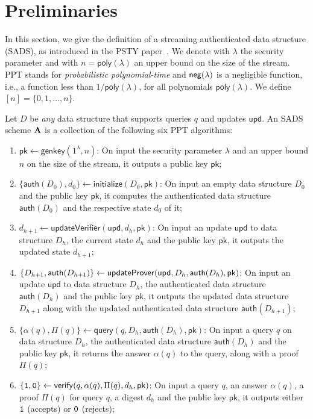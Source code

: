 \section{Preliminaries}\label{sads}
In this section, we give the definition of a streaming authenticated data structure (SADS), as introduced in the PSTY paper~\cite{DBLP:conf/eurocrypt/PapamanthouSTY13}.
We denote with $\lambda$ the security parameter and with $n=\mathsf{poly}(\lambda)$ an upper bound on the size of the stream. PPT stands for \emph{probabilistic polynomial-time} and $\mathsf{neg}(\lambda)$ is a negligible function, i.e., a function less than $1/\mathsf{poly}(\lambda)$, for all polynomials $\mathsf{poly}(\lambda)$. We define $[n]=\{0,1,\ldots,n\}$. 
\begin{defn}\label{define_sauth}
  Let $D$ be \emph{any} data structure that supports queries $q$ and
  updates $\mathsf{upd}$. An SADS scheme ${\bf A}$ is a collection of the following six PPT algorithms:
\begin{enumerate}
\item $\mathsf{pk}\leftarrow\mathsf{genkey}(1^\lambda,n)$: On
  input the security parameter $\lambda$ and an upper bound $n$ on the size of the stream, it outputs a public key $\mathsf{pk}$;

\item
  $\{\mathsf{auth}(D_0),d_0\}\leftarrow\mathsf{initialize}(D_0,\mathsf{pk})$:
  On input an empty data structure $D_0$ and the public key $\mathsf{pk}$, it computes the authenticated data structure $\mathsf{auth}(D_0)$ and the respective state $d_0$ of it;

\item
  $d_{h+1}\leftarrow\mathsf{updateVerifier}(\mathsf{upd},d_h,\mathsf{pk})$:
  On input an update $\mathsf{upd}$ to data structure $D_h$, the current state $d_h$ and the public key $\mathsf{pk}$, it outputs the updated state $d_{h+1}$;

\item
  $\{D_{h+1},\mathsf{auth}(D_{h+1})\}\leftarrow\mathsf{updateProver}(\mathsf{upd},D_h,\\ \mathsf{auth}(D_h),\mathsf{pk})$:
  On input an update $\mathsf{upd}$ to data structure $D_h$, the authenticated data
  structure $\mathsf{auth}(D_h)$ and the public key $\mathsf{pk}$, it
  outputs the updated data structure $D_{h+1}$ along with the updated
  authenticated data structure $\mathsf{auth}(D_{h+1})$;

\item
  $\{\alpha(q),\Pi(q)\}\leftarrow\mathsf{query}(q,D_h,\mathsf{auth}(D_h),\mathsf{pk})$:
  On input a query $q$ on data structure $D_h$, the authenticated data
  structure $\mathsf{auth}(D_h)$ and the public key $\mathsf{pk}$, it returns the
  answer $\alpha(q)$ to the query, along with a proof $\Pi(q)$;

\item $\{{\tt{1}},{\tt{0}}\}\leftarrow
   \mathsf{verify}(q,\alpha(q),\Pi(q),d_h,\mathsf{pk})$: On input a query $q$,
  an answer $\alpha(q)$, a proof $\Pi(q)$ for query $q$, a digest $d_h$ and the public key $\mathsf{pk}$,
  it outputs either $\tt{1}$ (accepts) or $\tt{0}$ (rejects);
  \end{enumerate}
\end{defn}
